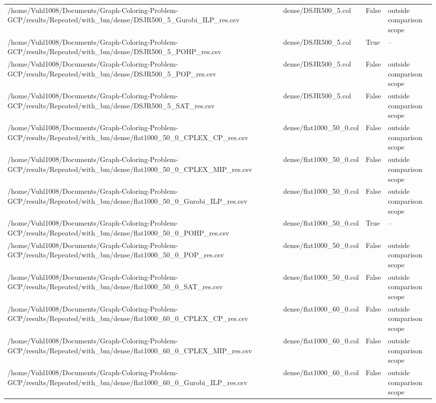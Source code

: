 \begin{table}[htbp]
\begin{tabular}{llll}
/home/Vuhl1008/Documents/Graph-Coloring-Problem-GCP/results/Repeated/with\_bm/dense/DSJR500\_5\_Gurobi\_ILP\_res.csv & dense/DSJR500\_5.col & False & outside comparison scope \\
/home/Vuhl1008/Documents/Graph-Coloring-Problem-GCP/results/Repeated/with\_bm/dense/DSJR500\_5\_POHP\_res.csv & dense/DSJR500\_5.col & True & -- \\
/home/Vuhl1008/Documents/Graph-Coloring-Problem-GCP/results/Repeated/with\_bm/dense/DSJR500\_5\_POP\_res.csv & dense/DSJR500\_5.col & False & outside comparison scope \\
/home/Vuhl1008/Documents/Graph-Coloring-Problem-GCP/results/Repeated/with\_bm/dense/DSJR500\_5\_SAT\_res.csv & dense/DSJR500\_5.col & False & outside comparison scope \\
/home/Vuhl1008/Documents/Graph-Coloring-Problem-GCP/results/Repeated/with\_bm/dense/flat1000\_50\_0\_CPLEX\_CP\_res.csv & dense/flat1000\_50\_0.col & False & outside comparison scope \\
/home/Vuhl1008/Documents/Graph-Coloring-Problem-GCP/results/Repeated/with\_bm/dense/flat1000\_50\_0\_CPLEX\_MIP\_res.csv & dense/flat1000\_50\_0.col & False & outside comparison scope \\
/home/Vuhl1008/Documents/Graph-Coloring-Problem-GCP/results/Repeated/with\_bm/dense/flat1000\_50\_0\_Gurobi\_ILP\_res.csv & dense/flat1000\_50\_0.col & False & outside comparison scope \\
/home/Vuhl1008/Documents/Graph-Coloring-Problem-GCP/results/Repeated/with\_bm/dense/flat1000\_50\_0\_POHP\_res.csv & dense/flat1000\_50\_0.col & True & -- \\
/home/Vuhl1008/Documents/Graph-Coloring-Problem-GCP/results/Repeated/with\_bm/dense/flat1000\_50\_0\_POP\_res.csv & dense/flat1000\_50\_0.col & False & outside comparison scope \\
/home/Vuhl1008/Documents/Graph-Coloring-Problem-GCP/results/Repeated/with\_bm/dense/flat1000\_50\_0\_SAT\_res.csv & dense/flat1000\_50\_0.col & False & outside comparison scope \\
/home/Vuhl1008/Documents/Graph-Coloring-Problem-GCP/results/Repeated/with\_bm/dense/flat1000\_60\_0\_CPLEX\_CP\_res.csv & dense/flat1000\_60\_0.col & False & outside comparison scope \\
/home/Vuhl1008/Documents/Graph-Coloring-Problem-GCP/results/Repeated/with\_bm/dense/flat1000\_60\_0\_CPLEX\_MIP\_res.csv & dense/flat1000\_60\_0.col & False & outside comparison scope \\
/home/Vuhl1008/Documents/Graph-Coloring-Problem-GCP/results/Repeated/with\_bm/dense/flat1000\_60\_0\_Gurobi\_ILP\_res.csv & dense/flat1000\_60\_0.col & False & outside comparison scope \\

\end{tabular}
\end{table}
